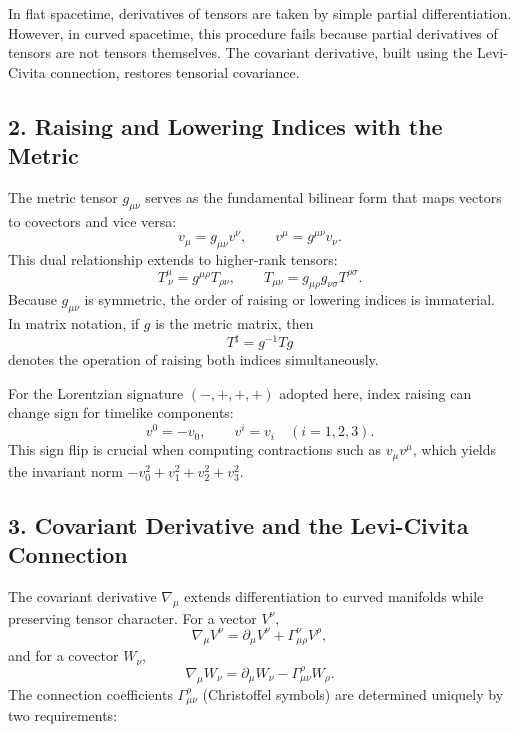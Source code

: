 \documentclass[11pt,oneside]{book}
\numberwithin{equation}{chapter}
\begin{document}
In flat spacetime, derivatives of tensors are taken by simple partial differentiation.  
However, in curved spacetime, this procedure fails because partial derivatives of tensors are not tensors themselves.  
The covariant derivative, built using the Levi-Civita connection, restores tensorial covariance.

\subsection*{2. Raising and Lowering Indices with the Metric}

The metric tensor $g_{\mu\nu}$ serves as the fundamental bilinear form that maps vectors to covectors and vice versa:
\begin{equation}
v_\mu = g_{\mu\nu}v^\nu, \qquad
v^\mu = g^{\mu\nu}v_\nu.
\end{equation}
This dual relationship extends to higher-rank tensors:
\begin{equation}
T^{\mu}_{\ \nu} = g^{\mu\rho} T_{\rho\nu}, \qquad
T_{\mu\nu} = g_{\mu\rho} g_{\nu\sigma} T^{\rho\sigma}.
\end{equation}
Because $g_{\mu\nu}$ is symmetric, the order of raising or lowering indices is immaterial.  
In matrix notation, if $g$ is the metric matrix, then
\begin{equation}
T^{\sharp} = g^{-1} T g
\end{equation}
denotes the operation of raising both indices simultaneously.  

For the Lorentzian signature $(-,+,+,+)$ adopted here, index raising can change sign for timelike components:
\begin{equation}
v^0 = -v_0, \qquad v^i = v_i \quad (i=1,2,3).
\end{equation}
This sign flip is crucial when computing contractions such as $v_\mu v^\mu$, which yields the invariant norm $-v_0^2 + v_1^2 + v_2^2 + v_3^2$.

\subsection*{3. Covariant Derivative and the Levi-Civita Connection}

The covariant derivative $\nabla_\mu$ extends differentiation to curved manifolds while preserving tensor character.  
For a vector $V^\nu$,
\begin{equation}
\nabla_\mu V^\nu = \partial_\mu V^\nu + \Gamma^\nu_{\mu\rho}V^\rho,
\end{equation}
and for a covector $W_\nu$,
\begin{equation}
\nabla_\mu W_\nu = \partial_\mu W_\nu - \Gamma^\rho_{\mu\nu}W_\rho.
\end{equation}
The connection coefficients $\Gamma^\rho_{\mu\nu}$ (Christoffel symbols) are determined uniquely by two requirements:
\end{document}
